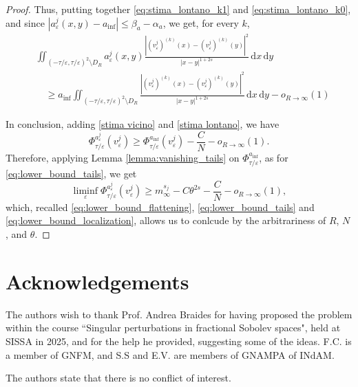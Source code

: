 \documentclass{article}
\theoremstyle{definition}
\newcommand{\abs}[1]{\left|#1\right|}
\newcommand{\de}{\mathrm{d}}
\newcommand{\e}{\varepsilon}
\def\e{\varepsilon}
\begin{document}
\begin{proof}
    Thus, putting together \eqref{eq:stima_lontano_k1} and \eqref{eq:stima_lontano_k0}, and since $|a^j_\e(x,y) - a_{\inf}|\leq \beta_a - \alpha_a$, we get, for every $k$,
\begin{equation}
    \begin{split}
           & \iint_{(-{\tau}/{\e},{\tau}/{\e})^2\setminus D_R} a^j_\e(x,y)\frac{\abs{(v_\e^j)^{(k)}(x) - (v_\e^j)^{(k)}(y)}^2}{\abs{x-y}^{1+2s}}\, \de x\,\de y\\
        &\label{stima lontano}
        \quad \geq a_{\inf}\iint_{(-{\tau}/{\e},{\tau}/{\e})^2\setminus D_R} \frac{\abs{(v_\e^j)^{(k)}(x) - (v_\e^j)^{(k)}(y)}^2}{\abs{x-y}^{1+2s}}\, \de x\,\de y - o_{R\to \infty}(1)
    \end{split}
\end{equation}

    In conclusion, adding \eqref{stima vicino} and \eqref{stima lontano}, we have
    \[ \Phi^{a^{j}_{\scriptstyle\e}}_{\tau/ \e}(v_\e^j) \geq  \Phi^{a_{\inf}}_{\tau/ \e}(v_\e^j) -\frac{C}{N}-o_{R\to \infty}(1).\]
    Therefore,  applying Lemma \ref{lemma:vanishing_tails} on $\Phi^{a_{\inf}}_{\tau/ \e}$, as for \eqref{eq:lower_bound_tails}, we get
    \begin{equation*}
        \liminf_\e \Phi^{a^{j}_{\scriptstyle\e}}_{\tau/ \e}(v_\e^j) \geq m^{s_j}_\infty -C\theta^{2s} - \frac{C}{N} -o_{R\to \infty}(1),
    \end{equation*}
    which, recalled \eqref{eq:lower_bound_flattening}, \eqref{eq:lower_bound_tails} and \eqref{eq:lower_bound_localization}, allows us to conlcude by the arbitrariness of $R$, $N$, and $\theta$.
\end{proof}

\section{Acknowledgements}
The authors wish to thank Prof. Andrea Braides for having proposed the problem within the course ``Singular perturbations in fractional Sobolev spaces", held at SISSA in 2025, and for the help he provided, suggesting some of the ideas. F.C. is a member of GNFM, and S.S and E.V. are members of GNAMPA of INdAM.

The authors state that there is no conflict of interest.





\printbibliography
%
%
\end{document}
